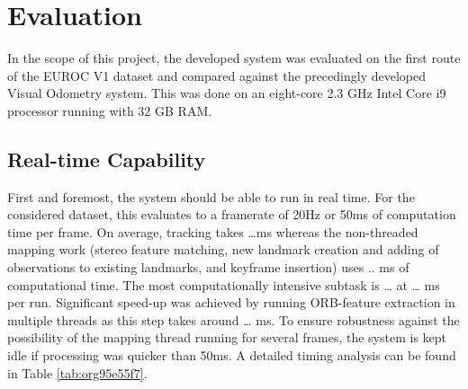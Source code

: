 \documentclass[a4paper, 10pt]{article}
\begin{document}
\section{Evaluation}
\label{sec:org60da359}
In the scope of this project, the developed system was evaluated on the first route of the EUROC V1 dataset \cite{euroc} and compared against the precedingly developed Visual Odometry system.
This was done on an eight-core 2.3 GHz Intel Core i9 processor running with 32 GB RAM. 

\subsection{Real-time Capability}
\label{sec:org24b4eb1}
First and foremost, the system should be able to run in real time. For the considered dataset, this evaluates to a framerate of 20Hz or 50ms of computation time per frame. 
On average, tracking takes \ldots{}ms whereas the non-threaded mapping work (stereo feature matching, new landmark creation and adding of observations to existing landmarks, 
and keyframe insertion) uses .. ms of computational time. The most computationally intensive subtask is … at … ms per run. Significant speed-up was achieved by running ORB-feature extraction in multiple threads as this 
step takes around … ms. To ensure robustness against the possibility of the mapping thread running for several frames, the system is kept idle if processing was quicker than 50ms. 
A detailed timing analysis can be found in Table \ref{tab:org95e55f7}.
\end{document}
